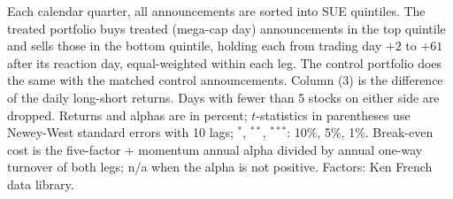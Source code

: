 \begin{table}[htbp]
\parbox{0.95\linewidth}{\footnotesize Each calendar quarter, all announcements are sorted into SUE quintiles. The treated portfolio buys treated (mega-cap day) announcements in the top quintile and sells those in the bottom quintile, holding each from trading day $+2$ to $+61$ after its reaction day, equal-weighted within each leg. The control portfolio does the same with the matched control announcements. Column (3) is the difference of the daily long-short returns. Days with fewer than 5 stocks on either side are dropped. Returns and alphas are in percent; $t$-statistics in parentheses use Newey-West standard errors with 10 lags; $^{*}$, $^{**}$, $^{***}$: 10\%, 5\%, 1\%. Break-even cost is the five-factor + momentum annual alpha divided by annual one-way turnover of both legs; n/a when the alpha is not positive. Factors: Ken French data library.}
\end{table}
